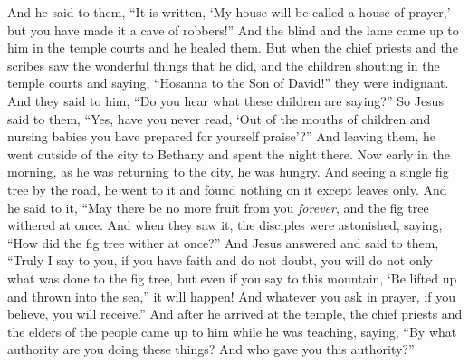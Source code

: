 \begin{biblechapter}
\verse And he said to them, “It is written, ‘My house will be called a house of prayer,’ but you have made it a cave of robbers!”
\verse And the blind and the lame came up to him in the temple courts and he healed them.
\verse But when the chief priests and the scribes saw the wonderful things that he did, and the children shouting in the temple courts and saying, “Hosanna to the Son of David!” they were indignant.
\verse And they said to him, “Do you hear what these children are saying?” So Jesus said to them, “Yes, have you never read, ‘Out of the mouths of children and nursing babies you have prepared for yourself praise’?”
\verse And leaving them, he went outside of the city to Bethany and spent the night there.
 Now early in the morning, as he was returning to the city, he was hungry.
\verse And seeing a single fig tree by the road, he went to it and found nothing on it except leaves only. And he said to it, “May there be no more fruit from you \textit{forever}, and the fig tree withered at once.
\verse And when they saw it, the disciples were astonished, saying, “How did the fig tree wither at once?”
\verse And Jesus answered and said to them, “Truly I say to you, if you have faith and do not doubt, you will do not only what was done to the fig tree, but even if you say to this mountain, ‘Be lifted up and thrown into the sea,” it will happen!
\verse And whatever you ask in prayer, if you believe, you will receive.”
 And after he arrived at the temple, the chief priests and the elders of the people came up to him while he was teaching, saying, “By what authority are you doing these things? And who gave you this authority?”

\end{biblechapter}
